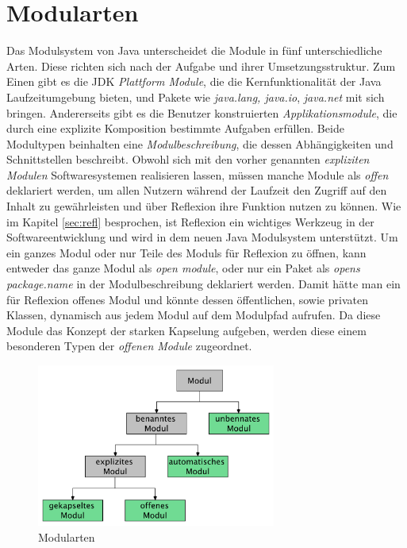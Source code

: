   \section{Modularten} \label{Modularten}
    Das Modulsystem von Java unterscheidet die Module in fünf unterschiedliche Arten. Diese richten sich nach der Aufgabe und ihrer Umsetzungsstruktur. Zum Einen gibt es die JDK \textit{Plattform Module}, die die Kernfunktionalität der Java Laufzeitumgebung bieten, und Pakete wie \textit{java.lang, java.io}, \textit{java.net} mit sich bringen. Andererseits gibt es die Benutzer konstruierten \textit{Applikationsmodule}, die durch eine explizite Komposition bestimmte Aufgaben erfüllen. Beide Modultypen beinhalten eine \textit{Modulbeschreibung}, die dessen Abhängigkeiten und Schnittstellen beschreibt.\newline
    Obwohl sich mit den vorher genannten \textit{expliziten Modulen} Softwaresystemen realisieren lassen, müssen manche Module als \textit{offen} deklariert werden, um allen Nutzern während der Laufzeit den Zugriff auf den Inhalt zu gewährleisten und über Reflexion ihre Funktion nutzen zu können. Wie im Kapitel \ref{sec:refl} besprochen, ist Reflexion ein wichtiges Werkzeug in der Softwareentwicklung und wird in dem neuen Java Modulsystem unterstützt. Um ein ganzes Modul oder nur Teile des Moduls für Reflexion zu öffnen, kann entweder das ganze Modul als \textit{open module}, oder nur ein Paket als \textit{opens package.name} in der Modulbeschreibung deklariert werden. Damit hätte man ein für Reflexion offenes Modul und könnte dessen öffentlichen, sowie privaten Klassen, dynamisch aus jedem Modul auf dem Modulpfad aufrufen. Da diese Module das Konzept der starken Kapselung aufgeben, werden diese einem besonderen Typen der \textit{offenen Module} zugeordnet. \cite{modulMitJava9,java9modRevealed,modulProgJava9,explorJava9}

    \begin{figure}[h]
      \centering
      \includegraphics[width=0.7\textwidth]{material/images/module-tree.pdf}
      \caption{Modularten \cite{modulMitJava9}}
      \label{fig:modtree}
    \end{figure}

